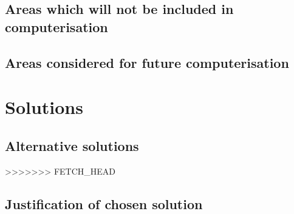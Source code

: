 \subsection{Areas which will not be included in computerisation}

\subsection{Areas considered for future computerisation}

\section{Solutions}

\subsection{Alternative solutions}

>>>>>>> FETCH_HEAD
\subsection{Justification of chosen solution}